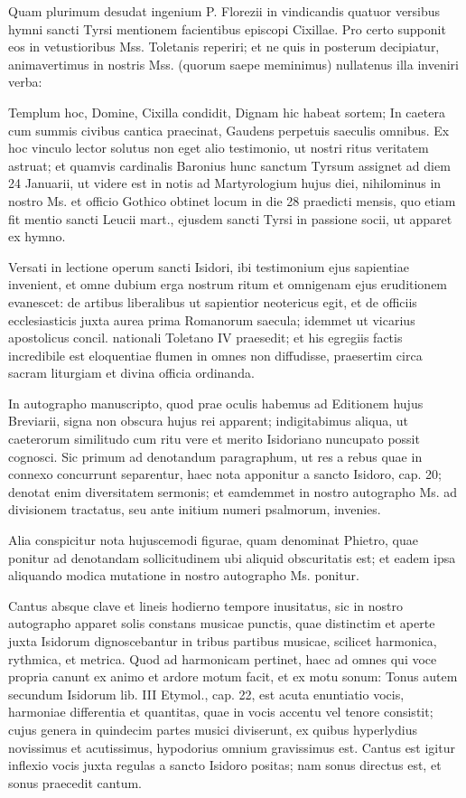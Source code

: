 \documentclass[letter,11pt]{book}
\begin{document}
Quam plurimum desudat ingenium P. Florezii in vindicandis quatuor versibus hymni sancti Tyrsi mentionem facientibus episcopi Cixillae. Pro certo supponit eos in vetustioribus Mss. Toletanis reperiri; et ne quis in posterum decipiatur, animavertimus in nostris Mss. (quorum saepe meminimus) nullatenus illa inveniri verba:

 Templum hoc, Domine, Cixilla condidit,
Dignam hic habeat sortem;
In caetera cum summis civibus cantica praecinat,
Gaudens perpetuis saeculis omnibus.
Ex hoc vinculo lector solutus non eget alio testimonio, ut nostri ritus veritatem astruat; et quamvis cardinalis Baronius hunc sanctum Tyrsum assignet ad diem 24 Januarii, ut videre est in notis ad Martyrologium hujus diei, nihilominus in nostro Ms. et officio Gothico obtinet locum in die 28 praedicti mensis, quo etiam fit mentio sancti Leucii mart., ejusdem sancti Tyrsi in passione socii, ut apparet ex hymno.

Versati in lectione operum sancti Isidori, ibi testimonium ejus sapientiae invenient, et omne dubium erga nostrum ritum et omnigenam ejus eruditionem evanescet: de artibus liberalibus ut sapientior neotericus egit, et de officiis ecclesiasticis juxta aurea prima Romanorum saecula; idemmet ut vicarius apostolicus concil. nationali Toletano IV praesedit; et his egregiis factis incredibile est eloquentiae flumen in omnes non diffudisse, praesertim circa sacram liturgiam et divina officia ordinanda.

In autographo manuscripto, quod prae oculis habemus ad Editionem hujus Breviarii, signa non obscura hujus rei apparent; indigitabimus aliqua, ut caeterorum similitudo cum ritu vere et merito Isidoriano nuncupato possit cognosci. Sic primum ad denotandum paragraphum, ut res a rebus quae in connexo concurrunt separentur, haec nota  apponitur a sancto Isidoro, cap. 20; denotat enim diversitatem sermonis; et eamdemmet in nostro autographo Ms. ad divisionem tractatus, seu ante initium numeri psalmorum, invenies.

Alia conspicitur nota hujuscemodi figurae, quam denominat Phietro, quae ponitur ad denotandam sollicitudinem ubi aliquid obscuritatis est; et eadem ipsa aliquando modica mutatione in nostro autographo Ms. ponitur.

Cantus absque clave et lineis hodierno tempore inusitatus, sic in nostro autographo apparet solis constans musicae punctis, quae distinctim et aperte juxta Isidorum dignoscebantur in tribus partibus musicae, scilicet harmonica, rythmica, et metrica. Quod ad harmonicam pertinet, haec ad omnes qui voce propria canunt ex animo et ardore motum facit, et ex motu sonum: Tonus autem secundum Isidorum lib. III Etymol., cap. 22, est acuta enuntiatio vocis, harmoniae differentia et quantitas, quae in vocis accentu vel tenore consistit; cujus genera in quindecim partes musici diviserunt, ex quibus hyperlydius novissimus et acutissimus, hypodorius omnium gravissimus est. Cantus est igitur inflexio vocis juxta regulas a sancto Isidoro positas; nam sonus directus est, et sonus praecedit cantum.
\end{document}
